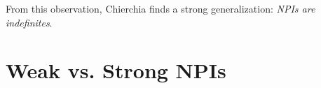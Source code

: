 \documentclass[a4paper,11pt]{article}
\begin{document}
From this observation, Chierchia finds a strong generalization: \emph{NPIs are indefinites}.
\section{Weak vs. Strong NPIs}
\end{document}
